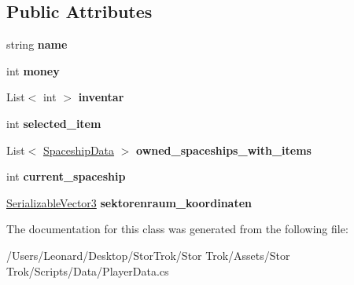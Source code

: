 \subsection*{Public Attributes}
\begin{DoxyCompactItemize}
\item 
\mbox{\label{class_player_data_a5b74be3f2b0098e0eeaa7e2603be0910}} 
string {\bfseries name}
\item 
\mbox{\label{class_player_data_a961f68b58c5bae23ae356114e2ac093f}} 
int {\bfseries money}
\item 
\mbox{\label{class_player_data_a727a94961f2bc63757ecca9a3345a467}} 
List$<$ int $>$ {\bfseries inventar}
\item 
\mbox{\label{class_player_data_a2ee6f73a86bcaed440d8e83849bd3063}} 
int {\bfseries selected\+\_\+item}
\item 
\mbox{\label{class_player_data_ab308180ee785d2f35ea745a380cb6276}} 
List$<$ \hyperlink{class_spaceship_data}{Spaceship\+Data} $>$ {\bfseries owned\+\_\+spaceships\+\_\+with\+\_\+items}
\item 
\mbox{\label{class_player_data_a2ee8dc2318b050e7aae9e380ac4ce502}} 
int {\bfseries current\+\_\+spaceship}
\item 
\mbox{\label{class_player_data_a59f5422266dac7e8ee6483b52733cd3a}} 
\hyperlink{class_serializable_vector3}{Serializable\+Vector3} {\bfseries sektorenraum\+\_\+koordinaten}
\end{DoxyCompactItemize}


The documentation for this class was generated from the following file\+:\begin{DoxyCompactItemize}
\item 
/\+Users/\+Leonard/\+Desktop/\+Stor\+Trok/\+Stor Trok/\+Assets/\+Stor Trok/\+Scripts/\+Data/Player\+Data.\+cs\end{DoxyCompactItemize}
